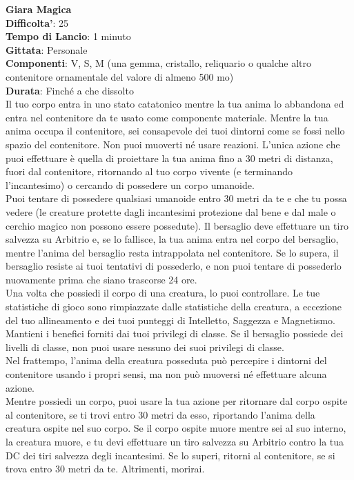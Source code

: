 \begin{multicols}{2}
\medskip\textbf{Giara Magica}\\
\textbf{Difficolta'}: 25\\
\textbf{Tempo di Lancio}: 1 minuto\\
\textbf{Gittata}: Personale\\
\textbf{Componenti}: V, S, M (una gemma, cristallo, reliquario o qualche altro contenitore ornamentale del valore di almeno 500 mo)\\
\textbf{Durata}: Finché a che dissolto\\
Il tuo corpo entra in uno stato catatonico mentre la tua anima lo abbandona ed entra nel contenitore da te usato come componente materiale. Mentre la tua anima occupa il contenitore, sei consapevole dei tuoi dintorni come se fossi nello spazio del contenitore. Non puoi muoverti né usare reazioni. L’unica azione che puoi effettuare è quella di proiettare la tua anima fino a 30 metri di distanza, fuori dal contenitore, ritornando al tuo corpo vivente (e terminando l’incantesimo) o cercando di possedere un corpo umanoide.\\
Puoi tentare di possedere qualsiasi umanoide entro 30 metri da te e che tu possa vedere (le creature protette dagli incantesimi protezione dal bene e dal male o cerchio magico non possono essere possedute). Il bersaglio deve effettuare un tiro salvezza su Arbitrio e, se lo fallisce, la tua anima entra nel corpo del bersaglio, mentre l’anima del bersaglio resta intrappolata nel contenitore. Se lo supera, il bersaglio resiste ai tuoi tentativi di possederlo, e non puoi tentare di possederlo nuovamente prima che siano trascorse 24 ore.\\
Una volta che possiedi il corpo di una creatura, lo puoi controllare. Le tue statistiche di gioco sono rimpiazzate dalle statistiche della creatura, a eccezione del tuo allineamento e dei tuoi punteggi di Intelletto, Saggezza e Magnetismo. Mantieni i benefici forniti dai tuoi privilegi di classe. Se il bersaglio possiede dei livelli di classe, non puoi usare nessuno dei suoi privilegi di classe.\\
Nel frattempo, l’anima della creatura posseduta può percepire i dintorni del contenitore usando i propri sensi, ma non può muoversi né effettuare alcuna azione.\\
Mentre possiedi un corpo, puoi usare la tua azione per ritornare dal corpo ospite al contenitore, se ti trovi entro 30 metri da esso, riportando l’anima della creatura ospite nel suo corpo. Se il corpo ospite muore mentre sei al suo interno, la creatura muore, e tu devi effettuare un tiro salvezza su Arbitrio contro la tua DC dei tiri salvezza degli incantesimi. Se lo superi, ritorni al contenitore, se si trova entro 30 metri da te. Altrimenti, morirai.\\

\end{multicols}
